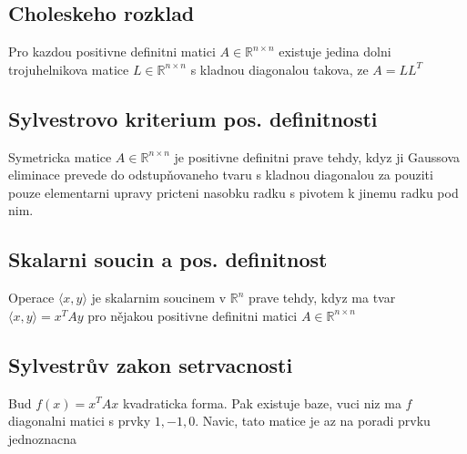 \documentclass[a4paper]{article}
\begin{document}
\subsection*{Choleskeho rozklad}
Pro kazdou positivne definitni matici $A \in \mathbb{R}^{n\times n}$
existuje jedina dolni trojuhelnikova matice $L \in \mathbb{R}^{n\times n}$
s kladnou diagonalou takova, ze $A = LL^T$


\subsection*{Sylvestrovo kriterium pos. definitnosti}
Symetricka matice $A \in \mathbb{R}^{n\times n}$
je positivne definitni prave tehdy,
kdyz ji Gaussova eliminace prevede do odstupňovaneho tvaru s kladnou diagonalou
za pouziti pouze elementarni upravy pricteni nasobku radku
s pivotem k jinemu radku pod nim.


\subsection*{Skalarni soucin a pos. definitnost}
Operace $\langle x, y\rangle$ je skalarnim soucinem v
$\mathbb{R}^{n}$ prave tehdy, kdyz ma tvar
$\langle x, y\rangle = x^TAy$ pro nějakou positivne definitni matici
$A \in \mathbb{R}^{n\times n}$


\subsection*{Sylvestrův zakon setrvacnosti}
Bud $f(x) = x^TAx$ kvadraticka forma.
Pak existuje baze, vuci niz ma $f$ diagonalni matici s prvky
$1, -1, 0$. Navic, tato matice je az na poradi prvku jednoznacna
\end{document}
